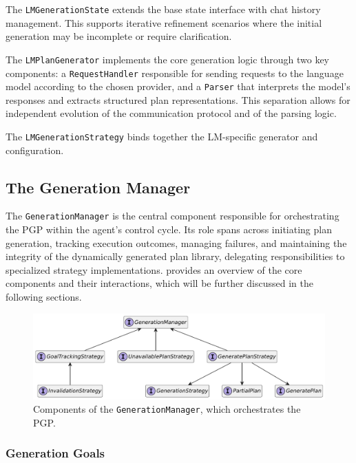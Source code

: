 \documentclass[12pt,a4paper,openright,twoside]{book}
\begin{document}
The \texttt{LMGenerationState} extends the base state interface with chat history management.
%
This supports iterative refinement scenarios where the initial generation may be incomplete or require clarification.

The \texttt{LMPlanGenerator} implements the core generation logic through two key components: a \texttt{RequestHandler} responsible for sending requests to the language model according to the chosen provider, and a \texttt{Parser} that interprets the model's responses and extracts structured plan representations. 
%
This separation allows for independent evolution of the communication protocol and of the parsing logic.

The \texttt{LMGenerationStrategy} binds together the LM-specific generator and configuration.

\subsection{The Generation Manager}\label{sec:generation-manager}

The \texttt{GenerationManager} is the central component responsible for orchestrating the \ac{PGP} within the agent's control cycle.
%
Its role spans across initiating plan generation, tracking execution outcomes, managing failures, and maintaining the integrity of the dynamically generated plan library, delegating responsibilities to specialized strategy implementations. 
%
 provides an overview of the core components and their interactions, which will be further discussed in the following sections.

\begin{figure}
    \centering
    \includegraphics[width=\textwidth]{figures/gen-manager.pdf}
    \caption{Components of the \texttt{GenerationManager}, which orchestrates the \ac{PGP}.}
    \label{fig:gen-manager}
\end{figure}

\subsubsection{Generation Goals}
\end{document}
